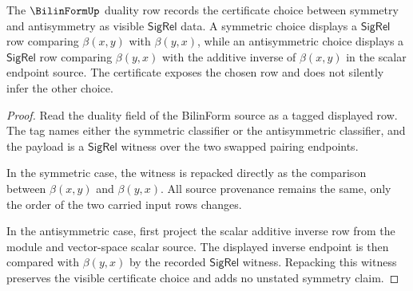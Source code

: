 \begin{theorem}
\label{thm:bilinform-dual-symmetry-row}
The $\BilinFormUp$ duality row records the certificate choice between
symmetry and antisymmetry as visible $\mathsf{SigRel}$ data. A symmetric
choice displays a $\mathsf{SigRel}$ row comparing $\beta(x,y)$ with
$\beta(y,x)$, while an antisymmetric choice displays a $\mathsf{SigRel}$ row
comparing $\beta(y,x)$ with the additive inverse of $\beta(x,y)$ in the
scalar endpoint source. The certificate exposes the chosen row and does not
silently infer the other choice.
\end{theorem}
\begin{proof}
Read the duality field of the BilinForm source as a tagged displayed row. The
tag names either the symmetric classifier or the antisymmetric classifier, and
the payload is a $\mathsf{SigRel}$ witness over the two swapped pairing
endpoints.

In the symmetric case, the witness is repacked directly as the comparison
between $\beta(x,y)$ and $\beta(y,x)$. All source provenance remains the same,
only the order of the two carried input rows changes.

In the antisymmetric case, first project the scalar additive inverse row from
the module and vector-space scalar source. The displayed inverse endpoint is
then compared with $\beta(y,x)$ by the recorded $\mathsf{SigRel}$ witness.
Repacking this witness preserves the visible certificate choice and adds no
unstated symmetry claim.
\end{proof}

